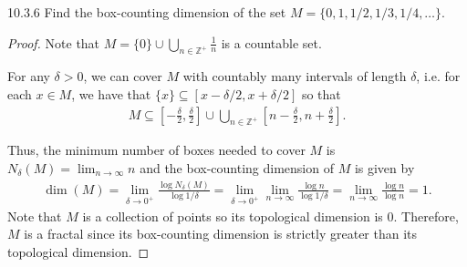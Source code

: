 \begin{problem}{10.3.6}
  Find the box-counting dimension of the set $M = \{0, 1, 1/2, 1/3, 1/4, \dots\}$.
\end{problem}

\begin{proof}
  Note that $\displaystyle M = \{0\} \cup \bigcup_{n\in \mathbb{Z}^+}\frac{1}{n}$ is a countable set.

  For any $\delta > 0$, we can cover $M$ with countably many intervals of length $\delta$, i.e.
  for each $x\in M$, we have that $\{x\} \subseteq [x -\delta/2 , x +\delta/2]$ so
  that
  \begin{align*}
    M \subseteq \left[-\frac{\delta}{2}, \frac{\delta}{2}\right] \cup \bigcup_{n\in \mathbb{Z}^+} \left[n-\frac{\delta}{2}, n + \frac{\delta}{2}\right].
  \end{align*}

  Thus, the minimum number of boxes needed to cover $M$ is $N_\delta(M) = \lim_{n\to\infty} n$ and
  the box-counting dimension of $M$ is given by
  \begin{align*}
    \dim(M) = \lim_{\delta \to 0^+} \frac{\log N_\delta(M)}{\log 1/\delta}
    = \lim_{\delta \to 0^+} \lim_{n\to\infty} \frac{\log n}{\log 1/\delta}
    = \lim_{n\to\infty} \frac{\log n}{\log n} = 1.
  \end{align*}
  Note that $M$ is a collection of points so its topological dimension is 0. Therefore, $M$
  is a fractal since its box-counting dimension is strictly greater than its topological dimension.
\end{proof}
\newpage
